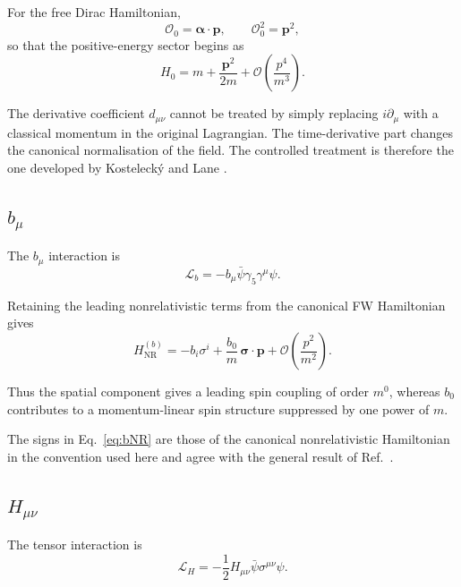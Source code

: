 \documentclass[aps,prd,reprint,superscriptaddress,nofootinbib]{revtex4-2}
\newcommand{\NR}{\mathrm{NR}}
\begin{document}
	For the free Dirac Hamiltonian,
	\begin{equation}
		\mathcal O_0=\boldsymbol{\alpha}\cdot\mathbf p,
		\qquad
		\mathcal O_0^2=\mathbf p^2,
	\end{equation}
	so that the positive-energy sector begins as
	\begin{equation}
		H_0=m+\frac{\mathbf p^2}{2m}
		+\mathcal O\!\left(\frac{p^4}{m^3}\right).
	\end{equation}
	
	The derivative coefficient $d_{\mu\nu}$ cannot be treated by simply
	replacing $i\partial_\mu$ with a classical momentum in the original
	Lagrangian. The time-derivative part changes the canonical
	normalisation of the field. The controlled treatment is therefore the
	one developed by Kostelecký and Lane \cite{KosteleckyLane1999}.
	
	\subsection{$b_\mu$}
	
	The $b_\mu$ interaction is
	\begin{equation}
		\mathcal L_b
		=
		-b_\mu\bar\psi\gamma_5\gamma^\mu\psi .
	\end{equation}
	
	Retaining the leading nonrelativistic terms from the canonical FW
	Hamiltonian gives
	\begin{equation}
		H_{\NR}^{(b)}
		=
		-b_i\sigma^i
		+\frac{b_0}{m}\,
		\boldsymbol{\sigma}\cdot\mathbf p
		+\mathcal O\!\left(\frac{p^2}{m^2}\right).
		\label{eq:bNR}
	\end{equation}
	
	Thus the spatial component gives a leading spin coupling of order
	$m^0$, whereas $b_0$ contributes to a momentum-linear spin structure
	suppressed by one power of $m$.
	
	The signs in Eq.~\eqref{eq:bNR} are those of the canonical
	nonrelativistic Hamiltonian in the convention used here and agree with
	the general result of Ref.~\cite{KosteleckyLane1999}.
	
	\subsection{$H_{\mu\nu}$}
	
	The tensor interaction is
	\begin{equation}
		\mathcal L_H
		=
		-\frac12 H_{\mu\nu}\bar\psi\sigma^{\mu\nu}\psi .
	\end{equation}
	
\end{document}
